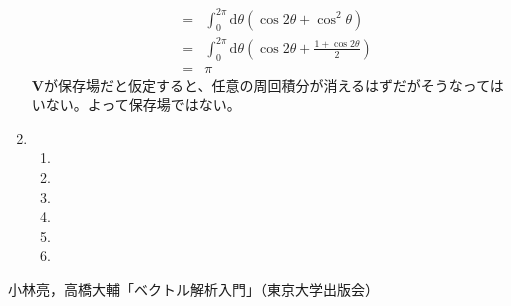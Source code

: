 \documentclass{jarticle}
\def\d{\mathrm d}
\begin{document}
\begin{enumerate}
\begin{eqnarray*}
        & = & \int_0^{2\pi} \d \theta ( \cos 2\theta + \cos^2 \theta) \\
        & = & \int_0^{2\pi} \d \theta \left( \cos 2\theta + \frac{1+\cos 2\theta}{2} \right) \\
        & = & \pi
      \end{eqnarray*}
      $\bm V$が保存場だと仮定すると、任意の周回積分が消えるはずだがそうなってはいない。よって保存場ではない。
    \item
      \begin{enumerate}
        \item
        \item
        \item
        \item
        \item
        \item
      \end{enumerate}
      
  \end{enumerate}


\newpage

\begin{thebibliography}{99}
 小林亮，高橋大輔「ベクトル解析入門」（東京大学出版会）
\end{thebibliography}
\end{document}
